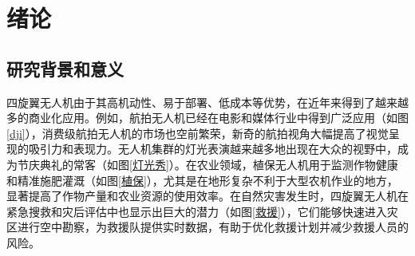 
\chapter{绪论}
\section{研究背景和意义}

四旋翼无人机由于其高机动性、易于部署、低成本等优势，在近年来得到了越来越多的商业化应用。例如，航拍无人机已经在电影和媒体行业中得到广泛应用（如图\ref{dji}），消费级航拍无人机的市场也空前繁荣，新奇的航拍视角大幅提高了视觉呈现的吸引力和表现力。无人机集群的灯光表演越来越多地出现在大众的视野中，成为节庆典礼的常客（如图\ref{灯光秀}）。在农业领域，植保无人机用于监测作物健康和精准施肥灌溉\cite{tokekar2016agricluture}（如图\ref{植保}），尤其是在地形复杂不利于大型农机作业的地方，显著提高了作物产量和农业资源的使用效率。在自然灾害发生时，四旋翼无人机在紧急搜救和灾后评估中也显示出巨大的潜力\cite{tomic2012}（如图\ref{救援}），它们能够快速进入灾区进行空中勘察，为救援队提供实时数据，有助于优化救援计划并减少救援人员的风险。

